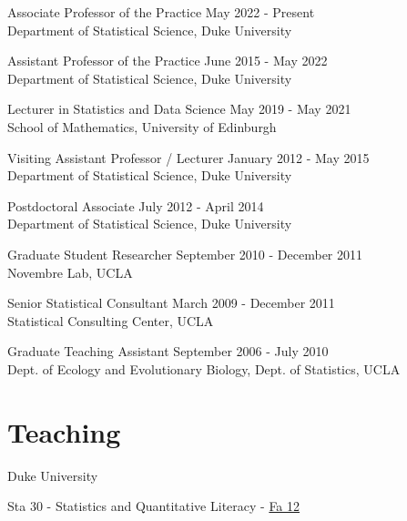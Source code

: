 \documentclass[margin,line]{res}
\begin{document}
\begin{resume}
Associate Professor of the Practice \hfill May 2022 - Present \\
{Department of Statistical Science}, Duke University \\
\vspace{-0.5cm}

Assistant Professor of the Practice \hfill June 2015 - May 2022 \\
{Department of Statistical Science}, Duke University \\
\vspace{-0.5cm}

Lecturer in Statistics and Data Science \hfill May 2019 - May 2021 \\
{School of Mathematics}, University of Edinburgh \\
\vspace{-0.5cm}

Visiting Assistant Professor / Lecturer  \hfill January 2012 - May 2015 \\
{Department of Statistical Science}, Duke University \\
\vspace{-0.5cm}

Postdoctoral Associate  \hfill July 2012 - April 2014 \\
{Department of Statistical Science}, Duke University \\
\vspace{-0.5cm}

Graduate Student Researcher \hfill September 2010 - December 2011 \\
{Novembre Lab}, UCLA \\
\vspace{-0.5cm}

Senior Statistical Consultant \hfill March 2009 - December 2011 \\
{Statistical Consulting Center}, UCLA \\
\vspace{-0.50cm}

Graduate Teaching Assistant \hfill September 2006 - July 2010 \\
{Dept. of Ecology and Evolutionary Biology, Dept. of Statistics}, UCLA \\


\section{\sc Teaching}


Duke University

\begin{list1}
\item[] Sta 30 - Statistics and Quantitative Literacy - \href{http://stat.duke.edu/courses/Spring12/sta10.1}{Fa 12}


\end{list1}
\end{resume}
\end{document}
